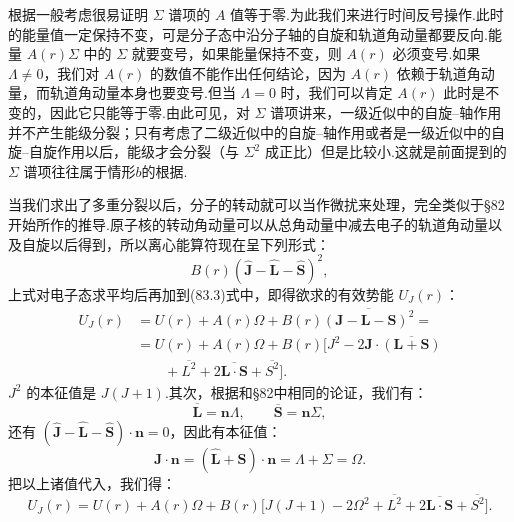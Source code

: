 根据一般考虑很易证明 $\Sigma$ 谱项的 $A$ 值等于零.为此我们来进行时间反号操作.此时的能量值一定保持不变，可是分子态中沿分子轴的自旋和轨道角动量都要反向.能量 $A(r)\Sigma$ 中的 $\Sigma$ 就要变号，如果能量保持不变，则 $A(r)$ 必须变号.如果 $\Lambda\neq0$，我们对 $A(r)$ 的数值不能作出任何结论，因为 $A(r)$ 依赖于轨道角动量，而轨道角动量本身也要变号.但当 $\Lambda=0$ 时，我们可以肯定 $A(r)$ 此时是不变的，因此它只能等于零.由此可见，对 $\Sigma$ 谱项讲来，一级近似中的自旋–轴作用并不产生能级分裂；只有考虑了二级近似中的自旋–轴作用或者是一级近似中的自旋–自旋作用以后，能级才会分裂（与 $\Sigma^2$ 成正比）但是比较小.这就是前面提到的 $\Sigma$ 谱项往往属于情形$b$的根据.

当我们求出了多重分裂以后，分子的转动就可以当作微扰来处理，完全类似于§82开始所作的推导.原子核的转动角动量可以从总角动量中减去电子的轨道角动量以及自旋以后得到，所以离心能算符现在呈下列形式：
\begin{equation*}
  B(r)(\hat{\boldsymbol{J}}-\hat{\boldsymbol{L}}-\hat{\boldsymbol{S}})^2,
\end{equation*}
上式对电子态求平均后再加到(83.3)式中，即得欲求的有效势能 $U_J(r)$：
\begin{equation*}
\begin{aligned}
  U_J(r)&=U(r)+A(r)\Omega+B(r)\overline{(\boldsymbol{J}-\boldsymbol{L}-\boldsymbol{S})^2}=\\
  &=U(r)+A(r)\Omega+B(r)\bigl[J^2-2\boldsymbol{J}\cdot\overline{(\boldsymbol{L}+\boldsymbol{S})}\\
  &\qquad+\overline{L^2}+2\overline{\boldsymbol{L}\cdot\boldsymbol{S}}+\overline{S^2}\bigr].
\end{aligned}
\end{equation*}
$J^2$ 的本征值是 $J(J+1)$.其次，根据和§82中相同的论证，我们有：
\begin{equation}
  \overline{\boldsymbol{L}}=\boldsymbol{n}\Lambda,\qquad
  \overline{\boldsymbol{S}}=\boldsymbol{n}\Sigma,
\end{equation}
还有 $(\hat{\boldsymbol{J}}-\hat{\boldsymbol{L}}-\hat{\boldsymbol{S}})\cdot\boldsymbol{n}=0$，因此有本征值：
\begin{equation}
  \boldsymbol{J}\cdot\boldsymbol{n}=(\hat{\boldsymbol{L}}+\hat{\boldsymbol{S}})\cdot\boldsymbol{n}
  =\Lambda+\Sigma=\Omega.
\end{equation}
把以上诸值代入，我们得：
\begin{equation*}
  U_J(r)=U(r)+A(r)\Omega+B(r)\bigl[J(J+1)-2\Omega^2
  +\overline{L^2}+2\overline{\boldsymbol{L}\cdot\boldsymbol{S}}+\overline{S^2}\bigr].
\end{equation*}
